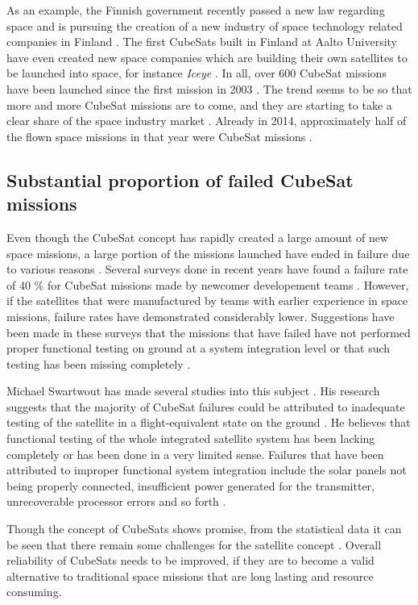 \documentclass[english,12pt,a4paper,pdftex,elec,utf8]{aaltothesis}
\begin{document}
As an example, the Finnish government recently passed a new law regarding space and is pursuing the creation of a new industry of space technology related companies in Finland \cite{filaw}. The first CubeSats built in Finland at Aalto University have even created new space companies which are building their own satellites to be launched into space, for instance \textit{Iceye} \cite{iceye}. In all, over 600 CubeSat missions have been launched since the first mission in 2003 \cite{Swart2017kalvo}. The trend seems to be so that more and more CubeSat missions are to come, and they are starting to take a clear share of the space industry market \cite{SpaceWorks2017}. Already in 2014, approximately half of the flown space missions in that year were CubeSat missions \cite{Swart2016}.\par 
\subsection{Substantial proportion of failed CubeSat missions}
Even though the CubeSat concept has rapidly created a large amount of new space missions, a large portion of the missions launched have ended in failure due to various reasons \cite{Swart2016, Langer}. Several surveys done in recent years have found a failure rate of 40 \% for CubeSat missions made by newcomer developement teams \cite{Swart2016, Langer, Swart1, Swart2015}. However, if the satellites that were manufactured by teams with earlier experience in space missions, failure rates have demonstrated considerably lower. Suggestions have been made in these surveys that the missions that have failed have not performed proper functional testing on ground at a system integration level or that such testing has been missing completely \cite{Swart2016, Langer, Swart1}.\par
Michael Swartwout has made several studies into this subject \cite{Swart2017kalvo}. His research suggests that the majority of CubeSat failures could be attributed to inadequate testing of the satellite in a flight-equivalent state on the ground \cite{Swart2016, Swart1, Swart2015}. He believes that functional testing of the whole integrated satellite system has been lacking completely or has been done in a very limited sense. Failures that have been attributed to improper functional system integration include the solar panels not being properly connected, insufficient power generated for the transmitter, unrecoverable processor errors and so forth \cite{Swart1}. \par
Though the concept of CubeSats shows promise, from the statistical data it can be seen that there remain some challenges for the satellite concept \cite{Swart2017kalvo, Swart2016, Langer, Swart1, Swart2015}. Overall reliability of CubeSats needs to be improved, if they are to become a valid alternative to traditional space missions that are long lasting and resource consuming.\par 
\end{document}
